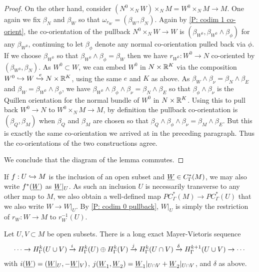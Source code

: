 \begin{proof}
On the other hand, consider $(N^0\times_N W)\times_N M=W^0\times_NM\to M$. One again we fix $\beta_N$ and $\beta_W$ so that $\omega_{r_W}=(\beta_W,\beta_N)$. Again by \cref{P: codim 1 co-orient}, the co-orientation of the pullback $N^0\times_N W\to W$ is $(\beta_{W^0},\beta_{W^0}\wedge \beta_\phi)$ for any $\beta_{W^0}$, continuing to let $\beta_\phi$ denote any normal co-orientation pulled back via $\phi$. If we choose $\beta_{W^0}$ so that $\beta_{W^0}\wedge \beta_\phi=\beta_W$ then we have $r_{W^0}:W^0\to N$ co-oriented by $(\beta_{W^0},\beta_N)$. As $W^0\subset W$, we can embed $W^0$ in $N\times \mathbb{R}^K$ via the composition $W^0\hookrightarrow W \xhookrightarrow{e}N\times \mathbb{R}^K$, using the same $e$ and $K$ as above. As $\beta_W\wedge \beta_\nu=\beta_N\wedge \beta_E$ and $\beta_W=\beta_{W^0}\wedge \beta_\phi$, we have $\beta_{W^0}\wedge \beta_\phi\wedge \beta_\nu=\beta_N\wedge \beta_E$ so that $\beta_\phi\wedge \beta_\nu$ is the Quillen orientation for the normal bundle of $W^0$ in $N\times \mathbb{R}^K$. Using this to pull back $W^0\to N$ to $W^0\times_NM\to M$, by definition the pullback co-orientation is $(\beta_Q,\beta_M)$ when $\beta_Q$ and $\beta_M$ are chosen so that $\beta_Q\wedge \beta_\phi\wedge \beta_\nu=\beta_M\wedge \beta_E$. But this is exactly the same co-orientation we arrived at in the preceding paragraph. Thus the co-orientations of the two constructions agree.


We conclude that the diagram of the lemma commutes.
\end{proof}


\begin{notation}
If $f: U\hookrightarrow M$ is the inclusion of an open subset and $\underline{W}\in C^*_\Gamma(M)$, we may also write $f^*(\underline{W})$ as $\underline{W}|_U$. As such an inclusion $U$ is necessarily transverse to any other map to $M$, we also obtain a well-defined map $PC^*_\Gamma(M)\to PC^*_\Gamma(U)$ that we also write $W\to W|_U$. By \cref{P: codim 0 pullback}, $W|_U$ is simply the restriction of $r_W \colon W \to M$ to $r_W^{-1}(U)$.
\end{notation}

\begin{theorem}\label{T: absolute MV}
Let $U,V\subset M$ be open subsets. There is a long exact Mayer-Vietoris sequence
$$\cdots\to H^k_\Gamma(U\cup V)\xrightarrow{i} H^k_\Gamma(U)\oplus H^k_\Gamma(V)\xrightarrow{j} H^k_\Gamma(U\cap V)\xrightarrow{\delta} H^{k+1}_\Gamma(U\cup V)\to\cdots$$
with  $i(\underline{W})=(\underline{W}|_U, -\underline{W}|_V)$, $j(\underline{W}_1,\underline{W}_2)=\underline{W}_1|_{U\cap V}+\underline{W}_2|_{U\cap V}$, and $\delta$ as above.
\end{theorem}



